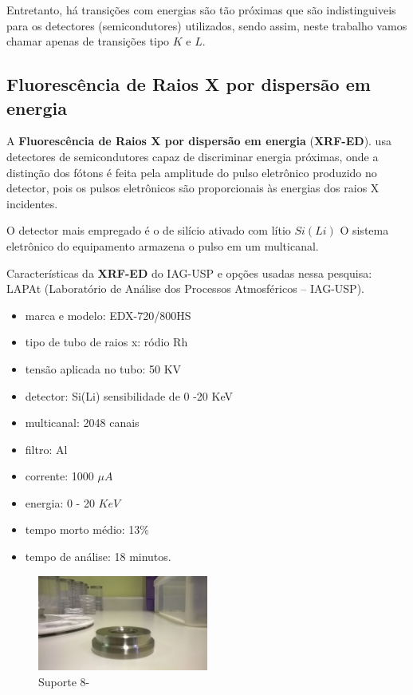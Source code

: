 Entretanto, há transições com energias são tão próximas 
que são indistinguiveis para os detectores (semicondutores) 
utilizados, sendo assim, neste trabalho vamos chamar apenas de 
transições tipo $K$ e $L$.

\subsection{Fluorescência de Raios X por dispersão em energia}

A \textbf{Fluorescência de Raios X por dispersão em energia} (\textbf{XRF-ED}).
usa detectores de semicondutores capaz de discriminar energia 
próximas, onde a distinção dos fótons é feita pela amplitude do pulso 
eletrônico produzido no detector, pois os pulsos eletrônicos são
proporcionais às energias dos raios X incidentes. 

O detector mais empregado é o de silício ativado com lítio $Si(Li)$ 
O sistema eletrônico do equipamento armazena o pulso em um multicanal.

Características da \textbf{XRF-ED} do IAG-USP e opções usadas nessa pesquisa:
LAPAt (Laboratório de Análise dos Processos Atmosféricos – IAG-USP).
\begin{itemize}
  \item marca e modelo: EDX-720/800HS
  \item tipo de tubo de raios x: ródio Rh
  \item tensão aplicada no tubo: 50 KV 
  \item detector: Si(Li) sensibilidade de 0 -20 KeV
  \item multicanal: 2048 canais
  \item filtro: Al
  \item corrente: 1000 $\mu A$
  \item energia: 0 - 20 $KeV$ 
  \item tempo morto médio: 13\%
  \item tempo de análise: 18 minutos.
\end{itemize}

\begin{figure}[H]
\begin{center}
  \includegraphics[width=0.5\textwidth]{../inputs/images/suporte8.jpg}
  \caption{Suporte 8- \label{fig:suporte8}}
\end{center}
\end{figure}

